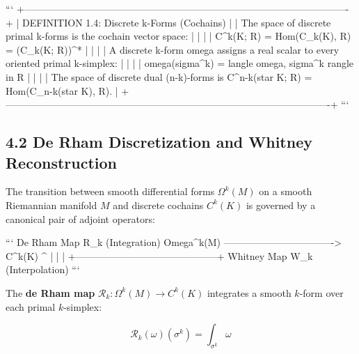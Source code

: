 \documentclass[11pt,twoside,openright]{amsbook}
\begin{document}
```
+----------------------------------------------------------------------------------------------------+
| DEFINITION 1.4: Discrete k-Forms (Cochains)                                                        |
| The space of discrete primal k-forms is the cochain vector space:                                  |
|                                                                                                    |
|   C^k(K; R) = Hom(C_k(K), R) = (C_k(K; R))^*                                                       |
|                                                                                                    |
| A discrete k-form omega assigns a real scalar to every oriented primal k-simplex:                   |
|                                                                                                    |
|   omega(sigma^k) = langle omega, sigma^k rangle in R                                               |
|                                                                                                    |
| The space of discrete dual (n-k)-forms is C^{n-k}(star K; R) = Hom(C_{n-k}(star K), R).            |
+----------------------------------------------------------------------------------------------------+
```

\subsection{4.2 De Rham Discretization and Whitney Reconstruction}

The transition between smooth differential forms $\Omega^k(M)$ on a smooth Riemannian manifold $M$ and discrete cochains $C^k(K)$ is governed by a canonical pair of adjoint operators:

```
                  De Rham Map R_k (Integration)
    Omega^k(M) ----------------------------------> C^k(K)
        ^                                            |
        |                                            |
        +--------------------------------------------+
                Whitney Map W_k (Interpolation)
```

The \textbf{de Rham map} $\mathcal{R}_k : \Omega^k(M) \to C^k(K)$ integrates a smooth $k$-form over each primal $k$-simplex:

$$\mathcal{R}_k(\omega)(\sigma^k) = \int_{\sigma^k} \omega$$
\end{document}
